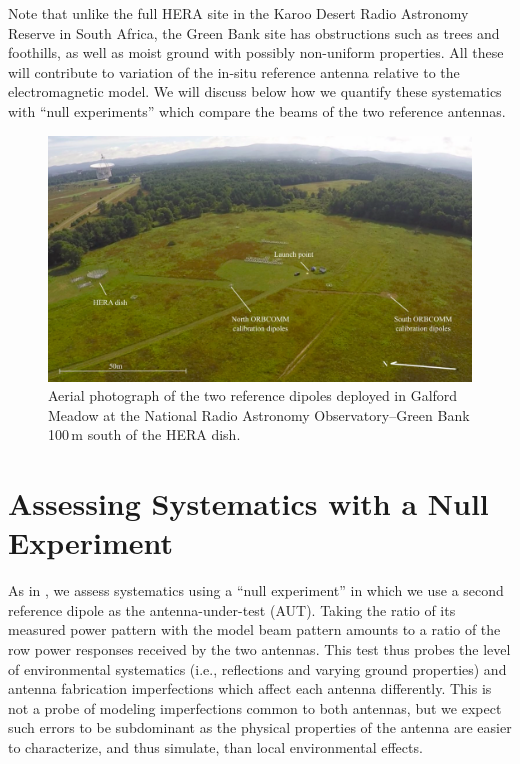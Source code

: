 \documentclass{emulateapj}
\begin{document}
Note that unlike the full HERA site in the Karoo Desert Radio Astronomy Reserve in South Africa, the Green Bank site has obstructions such as trees and foothills, as well as moist ground with possibly non-uniform properties. All these will contribute to variation of the in-situ reference antenna relative to the electromagnetic model. We will discuss below how we quantify these systematics with ``null experiments'' which compare the beams of the two reference antennas.

\begin{figure}[h]
\includegraphics[width=6.5in]{aerial.png}
\caption{Aerial photograph of the two reference dipoles deployed in Galford Meadow at the National Radio Astronomy Observatory--Green Bank 100\,m south of the HERA dish.}
\label{fig:aerial}
\end{figure}

\section{Assessing Systematics with a Null Experiment}

As in \citet{neben15}, we assess systematics using a ``null experiment'' in which we use a second reference dipole as the antenna-under-test (AUT). Taking the ratio of its measured power pattern with the model beam pattern amounts to a ratio of the row power responses received by the two antennas. This test thus probes the level of environmental systematics (i.e., reflections and varying ground properties) and antenna fabrication imperfections which affect each antenna differently. This is not a probe of modeling imperfections common to both antennas, but we expect such errors to be subdominant as the physical properties of the antenna are easier to characterize, and thus simulate, than local environmental effects. 
\end{document}
